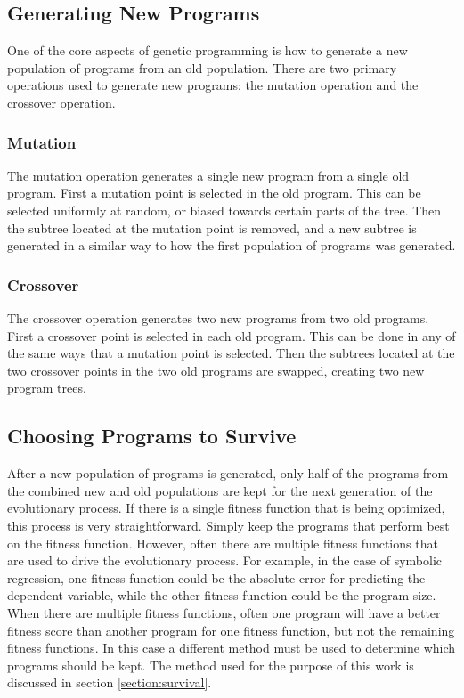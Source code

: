 \subsection{Generating New Programs}
\label{section:gp_operators}
One of the core aspects of genetic programming is how to generate a new population of programs from an old population.  There are two primary operations used to generate new programs: the mutation operation and the crossover operation.

\subsubsection{Mutation}
The mutation operation generates a single new program from a single old program.  First a mutation point is selected in the old program.  This can be selected uniformly at random, or biased towards certain parts of the tree.  Then the subtree located at the mutation point is removed, and a new subtree is generated in a similar way to how the first population of programs was generated.

\subsubsection{Crossover}
The crossover operation generates two new programs from two old programs.  First a crossover point is selected in each old program.  This can be done in any of the same ways that a mutation point is selected.  Then the subtrees located at the two crossover points in the two old programs are swapped, creating two new program trees.

\subsection{Choosing Programs to Survive}
After a new population of programs is generated, only half of the programs from the combined new and old populations are kept for the next generation of the evolutionary process.  If there is a single fitness function that is being optimized, this process is very straightforward.  Simply keep the programs that perform best on the fitness function.  However, often there are multiple fitness functions that are used to drive the evolutionary process.  For example, in the case of symbolic regression, one fitness function could be the absolute error for predicting the dependent variable, while the other fitness function could be the program size.  When there are multiple fitness functions, often one program will have a better fitness score than another program for one fitness function, but not the remaining fitness functions.  In this case a different method must be used to determine which programs should be kept.  The method used for the purpose of this work is discussed in section \ref{section:survival}.


